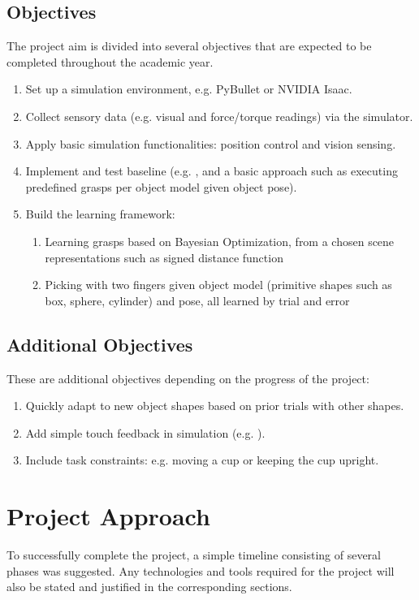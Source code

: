 \documentclass[a4paper]{report}
\begin{document}
\subsection{Objectives}
\label{sec:1.2.2}
The project aim is divided into several objectives that are expected to be completed throughout the academic year. 
\begin{enumerate}
    \item Set up a simulation environment, e.g. PyBullet or NVIDIA Isaac. 
    \item Collect sensory data (e.g. visual and force/torque readings) via the simulator.
    \item Apply basic simulation functionalities: position control and vision sensing.
    \item Implement and test baseline (e.g. \cite{breyer}, and a basic approach such as executing predefined grasps per object model given object pose).
    \item Build the learning framework:
    \begin{enumerate}
        \item Learning grasps based on Bayesian Optimization, from a chosen scene representations such as signed distance function 
        \item Picking with two fingers given object model (primitive shapes such as box, sphere, cylinder) and pose, all learned by trial and error
    \end{enumerate}
\end{enumerate}

\subsection{Additional Objectives}
These are additional objectives depending on the progress of the project:
\begin{enumerate}
    \item Quickly adapt to new object shapes based on prior trials with other shapes.
    \item Add simple touch feedback in simulation (e.g. \cite{bekiroglu}).
    \item Include task constraints: e.g. moving a cup or keeping the cup upright.
\end{enumerate}


\section{Project Approach}
\label{sec:1.3}
To successfully complete the project, a simple timeline consisting of several phases was suggested. Any technologies and tools required for the project will also be stated and justified in the corresponding sections.
\end{document}
